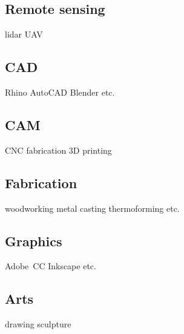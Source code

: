 \documentclass[]{baharmon_cv}
\begin{document}
{{{{{{\begin{minipage}[t]{0.3\textwidth}
\subsection{Remote sensing}
\vspace*{0.1cm}
lidar \textbullet{} UAV \\ 
\linespread{0.1}
\end{minipage} 
%
\hfill
%
\begin{minipage}[t]{0.33\textwidth} 
\subsection{CAD}
\vspace*{0.1cm}
Rhino \textbullet{} AutoCAD \textbullet{} Blender \textbullet{} etc. \\ 
\linespread{0.1}
%
\subsection{CAM}
\vspace*{0.1cm}
CNC fabrication \textbullet{} 3D printing \\ 
\linespread{0.1}
%
\subsection{Fabrication}
\vspace*{0.1cm}
woodworking \textbullet{} metal casting \textbullet{} thermoforming \textbullet{} etc. \\ 
\linespread{0.1}
\end{minipage} 
%
\hfill
%
\begin{minipage}[t]{0.2\textwidth} 
\subsection{Graphics}
\vspace*{0.1cm}
Adobe~CC \textbullet{} Inkscape \textbullet{} etc. \\ 
\linespread{0.1}
%
\subsection{Arts}
\vspace*{0.1cm}
drawing \textbullet{} sculpture \\ 
\linespread{0.1}
\end{minipage} 
%
\\
}

}}}}}
\end{document}
